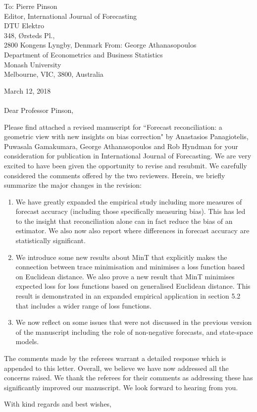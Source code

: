 \documentclass[11pt,a4paper]{letter}
\date{}
\begin{document}
 \begin{letter}{To: Pierre Pinson\\
 	Editor, International Journal of Forecasting\\
 	DTU Elektro\\
 	348, {\O}rsteds Pl., \\
 	2800 Kongens Lyngby, Denmark}
    From: George Athanasopoulos\\
    Department of Econometrics and Business Statistics\\
    Monash University\\
    Melbourne, VIC, 3800, Australia
 
 \opening{ March 12, 2018\\ \\Dear Professor Pinson,}
 \medskip

Please find attached a revised manuscript for ``Forecast reconciliation: a geometric view with new insights on bias correction" by Anastasios Panagiotelis, Puwasala Gamakumara, George Athanasopoulos and Rob Hyndman for your consideration for publication in International Journal of Forecasting. We are very excited to have been given the opportunity to revise and resubmit. We carefully considered the comments offered by the two reviewers. Herein, we briefly summarize the major changes in the revision:
\begin{enumerate}
	\item We have greatly expanded the empirical study including more measures of forecast accuracy (including those specifically measuring bias).  This has led to the insight that reconciliation alone can in fact reduce the bias of an estimator.  We also now also report where differences in forecast accuracy are statistically significant.
	\item We introduce some new results about MinT that explicitly makes the connection between trace minimisation and minimises a loss function based on Euclidean distance.  We also prove a new result that MinT minimises expected loss for loss functions based on generalised Euclidean distance.  This result is demonstrated in an expanded empirical application in section 5.2 that includes a wider range of loss functions. 
	\item We now reflect on some issues that were not discussed in the previous version of the manuscript including the role of non-negative forecasts, and state-space models. 
\end{enumerate}

The comments made by the referees warrant a detailed response which is appended to this letter. Overall, we believe we have now addressed all the concerns raised. We thank the referees for their comments as addressing these has significantly improved our manuscript. We look forward to hearing from you.

 \closing{With kind regards and best wishes,}

 \end{letter}
\end{document}
